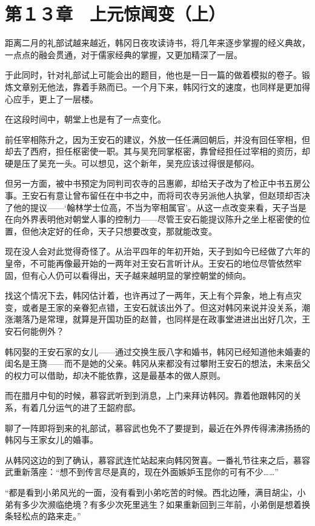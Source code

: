 \section{第１３章　上元惊闻变（上）}

距离二月的礼部试越来越近，韩冈日夜攻读诗书，将几年来逐步掌握的经义典故，一点点的融会贯通，对于儒家经典的掌握，又更加精深了一层。

于此同时，针对礼部试上可能会出的题目，他也是一日一篇的做着模拟的卷子。锻炼文章别无他法，靠着手熟而已。一个月下来，韩冈行文的速度，也同样是更加得心应手，更上了一层楼。

在这段时间中，朝堂上也是有了一点变化。

前任宰相陈升之，因为王安石的建议，外放一任任满回朝后，并没有回任宰相，但却去了西府，担任枢密使一职。其与吴充同掌枢密，靠曾经担任过宰相的资历，却硬是压了吴充一头。可以想见，这个新年，吴充应该过得很是郁闷。

但另一方面，被中书预定为同判司农寺的吕惠卿，却给天子改为了检正中书五房公事。王安石有意让曾布留任在中书之中，而将司农寺另派他人执掌，但赵顼却否决了他的提议——‘翰林学士位高，不当为宰相属官’。从这一点改变来看，天子当是在向外界表明他对朝堂人事的控制力——尽管王安石能提议陈升之坐上枢密使的位置，但他决定好的任命，天子只想要改变，那就能改变。

现在没人会对此觉得奇怪了。从治平四年的年初开始，天子到如今已经做了六年的皇帝，不可能再像最开始的一两年对王安石言听计从。王安石的地位尽管依然牢固，但有心人仍可以看得出，天子越来越明显的掌控朝堂的倾向。

找这个情况下去，韩冈估计着，也许再过了一两年，天上有个异象，地上有点灾变，或者是王家的亲眷犯点错，王安石就该出外了。但这对韩冈来说并没关系，潮涨潮落乃是常理，就算是开国功臣的赵普，也同样是在政事堂进进出出好几次，王安石何能例外？

韩冈娶的王安石家的女儿——通过交换生辰八字和婚书，韩冈已经知道他未婚妻的闺名是王旖——而不是她的父亲。韩冈从来都没有过攀附王安石的想法，未来岳父的权力可以借助，却决不能依靠，这是最基本的做人原则。

而在腊月中旬的时候，慕容武听到到消息，上门来拜访韩冈。靠着他跟韩冈的关系，有着几分运气的进了王韶府邸。

聊了一阵即将到来的礼部试，慕容武也免不了要提到，最近在外界传得沸沸扬扬的韩冈与王家女儿的婚事。

从韩冈这边的到了确认，慕容武连忙站起来向韩冈贺喜。一番礼节往来之后，慕容武重新落座：“想不到传言尽是真的，现在外面嫉妒玉昆你的可有不少……”

“都是看到小弟风光的一面，没有看到小弟吃苦的时候。西北边陲，满目胡尘，小弟有多少次濒临绝境？有多少次死里逃生？如果重新回到三年前，小弟倒是想着换条轻松点的路来走。”

